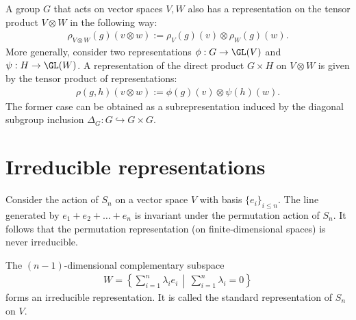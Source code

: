     \begin{example}
        A group $G$ that acts on vector spaces $V,W$ also has a representation on the tensor product $V\otimes W$ in the following way:
        \begin{gather}
            \rho_{V\otimes W}(g)(v\otimes w) := \rho_V(g)(v)\otimes\rho_W(g)(w).
        \end{gather}
        More generally, consider two representations $\phi:G\rightarrow\GL(V)$ and $\psi:H\rightarrow\GL(W)$. A representation of the direct product $G\times H$ on $V\otimes W$ is given by the tensor product of representations:
        \begin{gather}
            \rho(g,h)(v\otimes w) := \phi(g)(v)\otimes\psi(h)(w).
        \end{gather}
        The former case can be obtained as a subrepresentation induced by the diagonal subgroup inclusion $\Delta_G:G\hookrightarrow G\times G$.
    \end{example}


\section{Irreducible representations}\label{section:irreducibility}


    \begin{example}
        Consider the action of $S_n$ on a vector space $V$ with basis $\{e_i\}_{i\leq n}$. The line generated by $e_1+e_2+\ldots+e_n$ is invariant under the permutation action of $S_n$. It follows that the permutation representation (on finite-dimensional spaces) is never irreducible.

        The $(n-1)$-dimensional complementary subspace
        \begin{gather}
            W = \left\{\sum_{i=1}^n\lambda_ie_i\,\middle\vert\,\sum_{i=1}^n\lambda_i=0\right\}
        \end{gather}
        forms an irreducible representation. It is called the standard representation of $S_n$ on $V$.
    \end{example}

